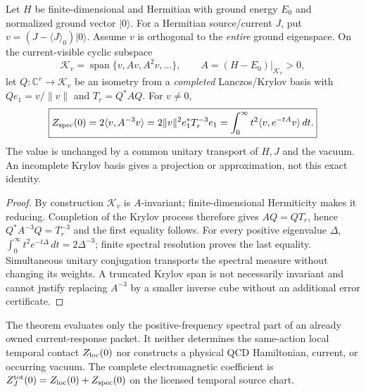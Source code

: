 \documentclass[12pt,a4paper]{article}
\begin{document}
\begin{theorem}
\label{p4b:thm:v356-current-visible-krylov}
Let $H$ be finite-dimensional and Hermitian with ground energy $E_0$
and normalized ground vector $\lvert 0\rangle$.  For a Hermitian
source/current $J$, put $v=(J-\langle J\rangle_0)\lvert0\rangle$.
Assume $v$ is orthogonal to the \emph{entire} ground eigenspace.
On the current-visible cyclic subspace
\[
 \mathcal K_v=\operatorname{span}\{v,Av,A^2v,\ldots\},
 \qquad A=(H-E_0)|_{\mathcal K_v}>0,
\]
let $Q:\mathbb C^r\to\mathcal K_v$ be an isometry from a
\emph{completed} Lanczos/Krylov basis with
$Qe_1=v/\|v\|$ and $T_r=Q^*AQ$.  For $v\ne0$,
\[
 \boxed{Z_{\rm spec}(0)=2\langle v,A^{-3}v\rangle
     =2\|v\|^2e_1^*T_r^{-3}e_1
     =\int_0^\infty t^2\langle v,e^{-tA}v\rangle\,dt.}
\]
The value is unchanged by a common unitary transport of $H,J$ and
the vacuum.  An incomplete Krylov basis gives a projection or
approximation, not this exact identity.
\end{theorem}
\begin{proof}
By construction $\mathcal K_v$ is $A$-invariant; finite-dimensional
Hermiticity makes it reducing.  Completion of the Krylov process
therefore gives $AQ=QT_r$, hence
$Q^*A^{-3}Q=T_r^{-3}$ and the first equality follows.
For every positive eigenvalue $\Delta$,
$\int_0^\infty t^2 e^{-t\Delta}\,dt=2\Delta^{-3}$;
finite spectral resolution proves the last equality.
Simultaneous unitary conjugation transports the spectral measure
without changing its weights.  A truncated Krylov span is not
necessarily invariant and cannot justify replacing $A^{-3}$ by a
smaller inverse cube without an additional error certificate.
\end{proof}

\begin{remark}
\label{p4b:rem:v356-current-krylov-scope}
The theorem evaluates only the positive-frequency spectral part
of an already owned current-response packet.  It neither determines
the same-action local temporal contact $Z_{\rm loc}(0)$ nor
constructs a physical QCD Hamiltonian, current, or occurring vacuum.
The complete electromagnetic coefficient is
$Z_J^{\rm tot}(0)=Z_{\rm loc}(0)+Z_{\rm spec}(0)$ on the licensed
temporal source chart.
\end{remark}


\end{document}
